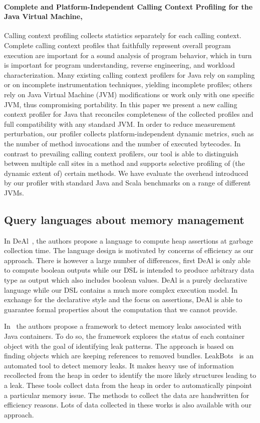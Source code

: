 \paragraph{Complete and Platform-Independent Calling Context Profiling for the Java Virtual Machine, \cite{Sarimbekov201161}}
Calling context profiling collects statistics separately for each calling context. Complete calling context profiles that faithfully represent overall program execution are important for a sound analysis of program behavior, which in turn is important for program understanding, reverse engineering, and workload characterization. Many existing calling context profilers for Java rely on sampling or on incomplete instrumentation techniques, yielding incomplete profiles; others rely on Java Virtual Machine (JVM) modifications or work only with one specific JVM, thus compromising portability. In this paper we present a new calling context profiler for Java that reconciles completeness of the collected profiles and full compatibility with any standard JVM. In order to reduce measurement perturbation, our profiler collects platform-independent dynamic metrics, such as the number of method invocations and the number of executed bytecodes. In contrast to prevailing calling context profilers, our tool is able to distinguish between multiple call sites in a method and supports selective profiling of (the dynamic extent of) certain methods. We have evaluate the overhead introduced by our profiler with standard Java and Scala benchmarks on a range of different JVMs.

\subsection{Query languages about memory management}

In DeAl~\cite{Reichenbach:2010:GCE:1869459.1869482}, the authors propose a language to compute heap assertions at garbage collection time.
The language design is motivated by concerns of efficiency as our approach.
There is however a large number of differences, first DeAl is only able to compute boolean outputs while our DSL is intended to produce arbitrary data type as output which also includes boolean values.
DeAl is a purely declarative language while our DSL contains a much more complex execution model.
In exchange for the declarative style and the focus on assertions, DeAl is able to guarantee formal properties about the computation that we cannot provide. 

In~\cite{Xu:2013:PML:2491509.2491511} the authors propose a framework to detect memory leaks associated with Java containers.
To do so, the framework explores the status of each container object with the goal of identifying leak patterns. The approach is based on finding objects which are keeping references to removed bundles. LeakBots~\cite{Mitchell03leakbot:an} is an automated tool to detect memory leaks. It makes heavy
use of information recollected from the heap in order to identify the more likely structures leading to a leak.
These tools collect data from the heap in order to automatically pinpoint a particular memory issue.
The methods to collect the data are handwritten for efficiency reasons.
Lots of data collected in these works is also available with our approach.


